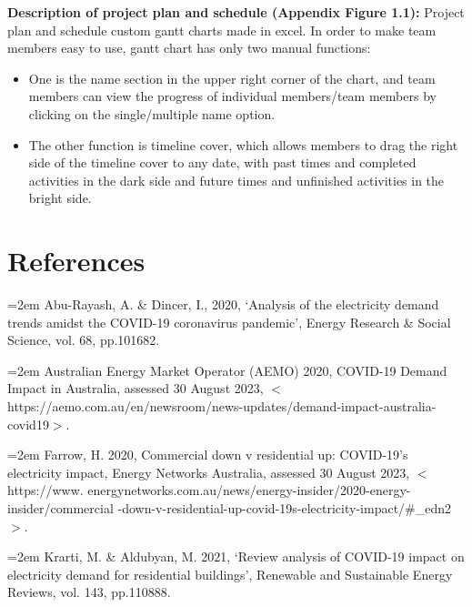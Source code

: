 \documentclass[mstat,12pt]{unswthesis}
\begin{document}
\bigskip

\textbf{Description of project plan and schedule (Appendix Figure 1.1):}
Project plan and schedule custom gantt charts made in excel. In order to make team members easy to use, gantt chart has only two manual functions: 
\begin{itemize}
    \item One is the name section in the upper right corner of the chart, and team members can view the progress of individual members/team members by clicking on the single/multiple name option. \item The other function is timeline cover, which allows members to drag the right side of the timeline cover to any date, with past times and completed activities in the dark side and future times and unfinished activities in the bright side.	
\end{itemize}


	
\bigskip

\hypertarget{references}{%
\chapter*{References}\label{references}}




\hypertarget{refs}{}

\leavevmode{}%
\hangindent=2em
Abu-Rayash, A. \& Dincer, I., 2020, ‘Analysis of the electricity demand trends amidst the COVID-19 coronavirus pandemic’, Energy Research \& Social Science, vol. 68, pp.101682. \hfill\break

\hangindent=2em
\noindent Australian Energy Market Operator (AEMO) 2020, COVID-19 Demand Impact in Australia, assessed 30 August 2023, $<$https://aemo.com.au/en/newsroom/news-updates/demand-impact-australia-covid19$>$. \hfill\break

\hangindent=2em
\noindent Farrow, H. 2020, Commercial down v residential up: COVID-19’s electricity impact, Energy Networks Australia, assessed 30 August 2023, $<$https://www. energynetworks.com.au/news/energy-insider/2020-energy-insider/commercial -down-v-residential-up-covid-19s-electricity-impact/\#\_edn2$>$. \hfill\break

\hangindent=2em
\noindent Krarti, M. \& Aldubyan, M. 2021, ‘Review analysis of COVID-19 impact on electricity demand for residential buildings’, Renewable and Sustainable Energy Reviews, vol. 143, pp.110888. \hfill\break
\end{document}
